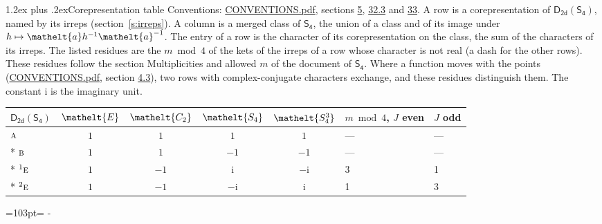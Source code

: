 \documentclass[10pt,a4paper]{article}
\makeatletter
\renewcommand\section{\@startsection{section}{1}{\z@}{-3ex plus -1ex minus -.2ex}%
  {1.2ex plus .2ex}{\normalfont\large\sffamily\bfseries\color{parttitle}}}
\newcommand{\needspace}[1]{\par\penalty-100\begingroup\dimen0=#1\relax\dimen2=\pagegoal
  \advance\dimen2-\pagetotal\ifdim\dimen0>\dimen2\relax\ifdim\dimen2>0pt\vfil\break\fi\fi
  \endgroup}
\numberwithin{equation}{section}
\newcommand{\eltfont}[1]{{\let\sigma\eltsigma\mathelt{#1}}}
\newcommand{\grp}[1]{\mathsf{#1}}
\newcommand{\irr}[1]{\text{\normalfont\scshape #1}}
\newcommand{\conjpair}[1]{{}^{#1}}
\newcommand{\cls}[1]{\eltfont{#1}}
\newcommand{\elt}[1]{\eltfont{#1}}
\newcommand{\iunit}{\mathrm{i}}
\makeatother
\begin{document}
\section{Corepresentation table}\label{s:character_table}
Conventions: \href{../../CONVENTIONS.pdf}{CONVENTIONS.pdf}, sections \href{../../../rotation/CONVENTIONS.pdf\#conv.5}{5}, \href{../../CONVENTIONS.pdf\#conv.32.3}{32.3} and \href{../../CONVENTIONS.pdf\#conv.33}{33}.
A row is a corepresentation of $\grp{D_{2d}}(\grp{S_{4}})$, named by its irreps (section~\ref{s:irreps}). A column is a merged class of $\grp{S_{4}}$, the union of a class and of its image under $h \mapsto \elt{a} h^{-1} \elt{a}^{-1}$. The entry of a row is the character of its corepresentation on the class, the sum of the characters of its irreps.
\leavevmode\label{n:head.parity}The listed residues are the $m \bmod 4$ of the kets of the irreps of a row whose character is not real (a dash for the other rows). These residues follow the section Multiplicities and allowed $m$ of the document of \href{../../../rotation/data/pdf/S4.pdf}{$\grp{S_{4}}$}. Where a function moves with the points (\href{../../CONVENTIONS.pdf}{CONVENTIONS.pdf}, section \href{../../../rotation/CONVENTIONS.pdf\#conv.4.3}{4.3}), two rows with complex-conjugate characters exchange, and these residues distinguish them.
The constant $\iunit$ is the imaginary unit.
{\small\setlength{\tabcolsep}{4pt}\begin{longtable}{@{}lccccll@{}}\toprule
$\grp{D_{2d}}(\grp{S_{4}})$ & $\cls{E}$ & $\cls{C_{2}}$ & $\cls{S_{4}}$ & $\cls{S_{4}^{3}}$ & $m \bmod 4$, $J$ even & $J$ odd\\\midrule\endhead
\bottomrule\endfoot\endlastfoot
$\irr{a}$ & $1$ & $1$ & $1$ & $1$ & --- & ---\\*
$\irr{b}$ & $1$ & $1$ & $-1$ & $-1$ & --- & ---\\*
$\conjpair{1}\irr{e}$ & $1$ & $-1$ & $\iunit{}$ & $-\iunit{}$ & 3 & 1\\*
$\conjpair{2}\irr{e}$ & $1$ & $-1$ & $-\iunit{}$ & $\iunit{}$ & 1 & 3\\
\bottomrule\end{longtable}}
\needspace{103pt}
\end{document}
